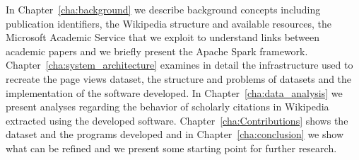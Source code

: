 In Chapter~\ref{cha:background} we describe background concepts including publication identifiers, the Wikipedia structure and available resources, the Microsoft Academic Service that we exploit to understand links between academic papers and we briefly present the Apache Spark framework.
Chapter~\ref{cha:system_architecture} examines in detail the infrastructure used to recreate the page views dataset, the structure and problems of datasets and the implementation of the software developed.
In Chapter~\ref{cha:data_analysis} we present analyses regarding the behavior of scholarly citations in Wikipedia extracted using the developed software.
Chapter~\ref{cha:Contributions} shows the dataset and the programs developed and
in Chapter~\ref{cha:conclusion} we show what can be refined and we present some starting point for further research.
